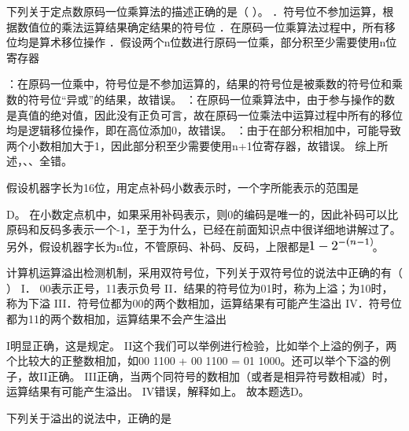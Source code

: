 \question 下列关于定点数原码一位乘算法的描述正确的是（ ）。
．符号位不参加运算，根据数值位的乘法运算结果确定结果的符号位
．在原码一位乘算法过程中，所有移位均是算术移位操作
．假设两个n位数进行原码一位乘，部分积至少需要使用n位寄存器
\par{}
\begin{solution}：在原码一位乘中，符号位是不参加运算的，结果的符号位是被乘数的符号位和乘数的符号位``异或''的结果，故错误。
：在原码一位乘算法中，由于参与操作的数是真值的绝对值，因此没有正负可言，故在原码一位乘法中运算过程中所有的移位均是逻辑移位操作，即在高位添加0，故错误。
：由于在部分积相加中，可能导致两个小数相加大于1，因此部分积至少需要使用n+1位寄存器，故错误。
综上所述，、、全错。
\end{solution}
\question 假设机器字长为16位，用定点补码小数表示时，一个字所能表示的范围是
\par\fourch{}{}{}{\textcolor{red}{}}
\begin{solution}D。
在小数定点机中，如果采用补码表示，则0的编码是唯一的，因此补码可以比原码和反码多表示一个-1，至于为什么，已经在前面知识点中很详细地讲解过了。另外，假设机器字长为n位，不管原码、补码、反码，上限都是\includegraphics[width=0.83333in,height=0.17708in]{texmath/8dff4c5Cdpi7B3507D1-7B25E7B-28n-1297D7D}。
\end{solution}
\question 计算机运算溢出检测机制，采用双符号位，下列关于双符号位的说法中正确的有（
） I． 00表示正号，11表示负号
II．结果的符号位为01时，称为上溢；为10时，称为下溢
III．符号位都为00的两个数相加，运算结果有可能产生溢出
IV．符号位都为11的两个数相加，运算结果不会产生溢出
\par{}
\begin{solution}I明显正确，这是规定。
II这个我们可以举例进行检验，比如举个上溢的例子，两个比较大的正整数相加，如00
1100 + 00 1100 = 01 1000。还可以举个下溢的例子，故II正确。
III正确，当两个同符号的数相加（或者是相异符号数相减）时，运算结果有可能产生溢出。
IV错误，解释如上。 故本题选D。
\end{solution}
\question 下列关于溢出的说法中，正确的是
\par{}
